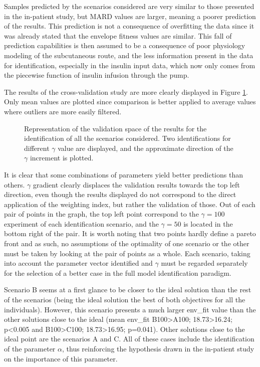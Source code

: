 Samples predicted by the scenarios considered are very similar to those presented in the in-patient study, but MARD values are larger, meaning a poorer prediction of the results. This prediction is not a consequence of overfitting the data since it was already stated that the envelope fitness values are similar. This fall of prediction capabilities is then assumed to be a consequence of poor physiology modeling of the subcutaneous route, and the less information present in the data for identification, especially in the insulin input data, which now only comes from the piecewise function of insulin infusion through the pump.

The results of the cross-validation study are more clearly displayed in Figure \ref{fig:YSISCInsscenarios}. Only mean values are plotted since comparison is better applied to average values where outliers are more easily filtered.

\begin{figure}[hbt]
\centering
{}\caption{Representation of the validation space of the results for the identification of all the scenarios considered. Two identifications for different $\gamma$ value are displayed, and the approximate direction of the $\gamma$ increment is plotted.}
\label{fig:YSISCInsscenarios}
\end{figure}

It is clear that some combinations of parameters yield better predictions than others. $\gamma$ gradient clearly displaces the validation results towards the top left direction, even though the results displayed do not correspond to the direct application of the weighting index, but rather the validation of those. Out of each pair of points in the graph, the top left point correspond to the $\gamma=100$ experiment of each identification scenario, and the $\gamma=50$ is located in the bottom right of the pair. It is worth noting that two points hardly define a pareto front and as such, no assumptions of the optimality of one scenario or the other must be taken by looking at the pair of points as a whole. Each scenario, taking into account the parameter vector identified and $\gamma$ must be regarded separately for the selection of a better case in the full model identification paradigm. 

Scenario B seems at a first glance to be closer to the ideal solution than the rest of the scenarios (being the ideal solution the best of both objectives for all the individuals). However, this scenario presents a much larger env\_fit value than the other solutions close to the ideal (mean env\_fit B100>A100; 18.73>16.24; p<0.005 and B100>C100; 18.73>16.95; p=0.041). Other solutions close to the ideal point are the scenarios A and C. All of these cases include the identification of the parameter $\alpha$, thus reinforcing the hypothesis drawn in the in-patient study on the importance of this parameter.

